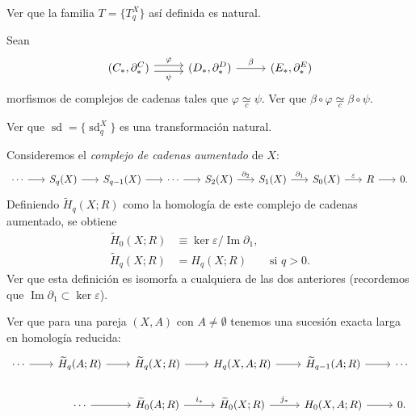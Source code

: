 \begin{ejercicio}
Ver que la familia $T = \{T_q^X\}$ así definida es natural.
\end{ejercicio}

\begin{ejercicio}
Sean
\[
\begin{tikzcd}[column sep=2.6em]
(C_*, \partial_*^C) \arrow[r, shift left=0.6ex, "\varphi"] \arrow[r, shift right=0.6ex, "\psi"'] & (D_*, \partial_*^D) \arrow[r, "\beta"] & (E_*, \partial_*^E)
\end{tikzcd}
\]
morfismos de complejos de cadenas tales que $\varphi \underset{c}{\simeq} \psi$. Ver que $\beta \circ \varphi \underset{c}{\simeq} \beta \circ \psi$.
\end{ejercicio}

\begin{ejercicio}
Ver que $\operatorname{sd} = \{\operatorname{sd}_q^X\}$ es una transformación natural.
\end{ejercicio}

\begin{ejercicio}
Consideremos el \textit{complejo de cadenas aumentado} de $X$:
\[
\begin{tikzcd}[column sep=1.7em]
\cdots \arrow[r] & S_q(X) \arrow[r] & S_{q-1}(X) \arrow[r] & \cdots \arrow[r] & S_2(X) \arrow[r, "\partial_2"] & S_1(X) \arrow[r, "\partial_1"] & S_0(X) \arrow[r, "\varepsilon"] & R \arrow[r] & 0.
\end{tikzcd}
\]
Definiendo $\widetilde{H}_q(X; R)$ como la homología de este complejo de cadenas aumentado, se obtiene
\begin{align*}
\widetilde{H}_0(X; R) &\equiv \ker\varepsilon / \operatorname{Im}\partial_1, \\
\widetilde{H}_q(X; R) &= H_q(X; R) \qquad \text{si } q > 0.
\end{align*}
Ver que esta definición es isomorfa a cualquiera de las dos anteriores (recordemos que $\operatorname{Im}\partial_1 \subset \ker\varepsilon$).
\end{ejercicio}

\begin{ejercicio}
Ver que para una pareja $(X, A)$ con $A \neq \emptyset$ tenemos una sucesión exacta larga en homología reducida:
\[
\begin{tikzcd}[column sep=2.2em, row sep=1.8em]
\cdots \arrow[r] & \widetilde{H}_q(A; R) \arrow[r] & \widetilde{H}_q(X; R) \arrow[r] & H_q(X, A; R) \arrow[r] & \widetilde{H}_{q-1}(A; R) \arrow[r] & \cdots \\
& \cdots \arrow[r] & \widetilde{H}_0(A; R) \arrow[r, "i_*"] & \widetilde{H}_0(X; R) \arrow[r, "j_*"] & H_0(X, A; R) \arrow[r] & 0.
\end{tikzcd}
\]
\end{ejercicio}

